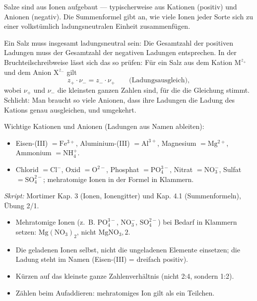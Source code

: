 

Salze sind aus Ionen aufgebaut --- typischerweise aus Kationen (positiv) und
Anionen (negativ). Die Summenformel gibt an, wie viele Ionen jeder Sorte sich zu
einer volkstümlich ladungsneutralen Einheit zusammenfügen.

\begin{werkzeugkasten}
Ein Salz muss insgesamt ladungsneutral sein: Die Gesamtzahl der positiven
Ladungen muss der Gesamtzahl der negativen Ladungen entsprechen. In der
Bruchteilschreibweise lässt sich das so prüfen: Für ein Salz aus dem Kation
$\mathrm{M}^{z_+}$ und dem Anion $\mathrm{X}^{z_-}$ gilt
\begin{equation}
  z_+ \cdot \nu_- = z_- \cdot \nu_+ \qquad\text{(Ladungsausgleich)},
\end{equation}
wobei $\nu_+$ und $\nu_-$ die kleinsten ganzen Zahlen sind, für die die
Gleichung stimmt. Schlicht: Man braucht so viele Anionen, dass ihre Ladungen die
Ladung des Kations genau ausgleichen, und umgekehrt.

Wichtige Kationen und Anionen (Ladungen aus Namen ableiten):
\begin{itemize}
  \item Eisen-(III) $= \mathrm{Fe^{3+}}$, Aluminium-(III) $= \mathrm{Al^{3+}}$,
        Magnesium $= \mathrm{Mg^{2+}}$, Ammonium $= \mathrm{NH_4^+}$.
  \item Chlorid $= \mathrm{Cl^-}$, Oxid $= \mathrm{O^{2-}}$, Phosphat
        $= \mathrm{PO_4^{3-}}$, Nitrat $= \mathrm{NO_3^-}$, Sulfat
        $= \mathrm{SO_4^{2-}}$; mehratomige Ionen in der Formel in Klammern.
\end{itemize}
\textit{Skript:} Mortimer Kap. 3 (Ionen, Ionengitter) und Kap. 4.1
(Summenformeln), Übung 2/1.
\end{werkzeugkasten}

\begin{achtung}
\begin{itemize}
  \item Mehratomige Ionen (z.~B. $\mathrm{PO_4^{3-}}$, $\mathrm{NO_3^-}$,
        $\mathrm{SO_4^{2-}}$) bei Bedarf in Klammern setzen: $\mathrm{Mg(NO_3)_2}$,
        nicht $\mathrm{MgNO_3,2}$.
  \item Die geladenen Ionen selbst, nicht die ungeladenen Elemente einsetzen;
        die Ladung steht im Namen (Eisen-(III) = dreifach positiv).
  \item Kürzen auf das kleinste ganze Zahlenverhältnis (nicht 2:4, sondern
        1:2).
  \item Zählen beim Aufaddieren: mehratomiges Ion gilt als ein Teilchen.
\end{itemize}
\end{achtung}
